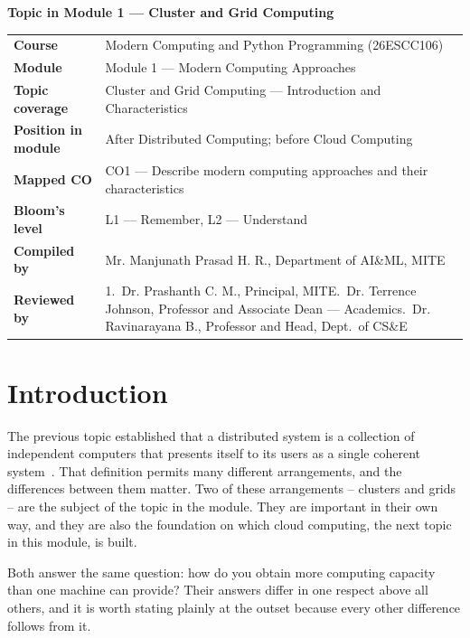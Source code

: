 \begin{center}
  {\Large\bfseries Topic in Module 1 --- Cluster and Grid Computing}
\end{center}

\begin{tabularx}{\textwidth}{@{}>{\bfseries}p{3.4cm}L@{}}
\toprule
Course            & Modern Computing and Python Programming (26ESCC106) \\
Module            & Module 1 --- Modern Computing Approaches \\
Topic coverage    & Cluster and Grid Computing --- Introduction and Characteristics \\
Position in module& After Distributed Computing; before Cloud Computing \\
Mapped CO         & CO1 --- Describe modern computing approaches and their characteristics \\
Bloom's level     & L1 --- Remember, L2 --- Understand \\
Compiled by       & Mr. Manjunath Prasad H. R., Department of AI\&ML, MITE \\
Reviewed by       & 1.~Dr. Prashanth C. M., Principal, MITE.~Dr. Terrence Johnson, Professor and Associate Dean --- Academics.~Dr. Ravinarayana B., Professor and Head, Dept.\ of CS\&E \\
\bottomrule
\end{tabularx}

\section{Introduction}

The previous topic established that a distributed system is a collection of
independent computers that presents itself to its users as a single coherent
system~. That definition permits many different arrangements, and the
differences between them matter. Two of these arrangements -- clusters and
grids -- are the subject of the topic in the module. They are important in their own
way, and they are also the foundation on which cloud computing, the next
topic in this module, is built.

Both answer the same question: how do you obtain more computing capacity than
one machine can provide? Their answers differ in one respect above all
others, and it is worth stating plainly at the outset because every other
difference follows from it.

